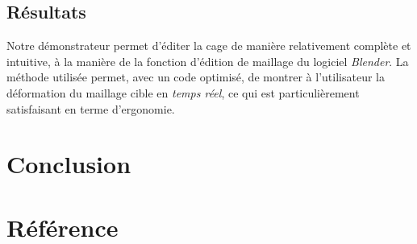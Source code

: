 \documentclass[10pt,a4paper]{article}
\begin{document}
\subsection{Résultats}

Notre démonstrateur permet d'éditer la cage de manière relativement complète et intuitive, à la manière de la fonction d'édition de maillage du logiciel \textit{Blender}. La méthode utilisée permet, avec un code optimisé, de montrer à l'utilisateur la déformation du maillage cible en \emph{temps réel}, ce qui est particulièrement satisfaisant en terme d'ergonomie.
\section*{Conclusion}

\section*{Référence}




\end{document}
